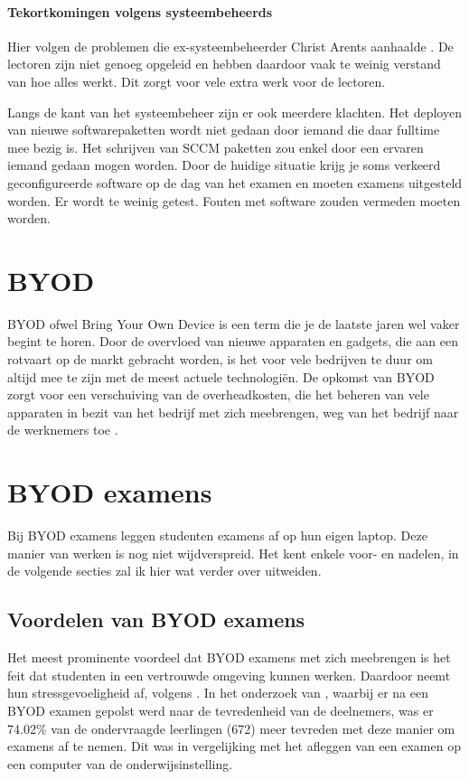 \paragraph{Tekortkomingen volgens systeembeheerds}
Hier volgen de problemen die ex-systeembeheerder Christ Arents aanhaalde \autocite{Arents2019}. De lectoren zijn niet genoeg opgeleid en hebben daardoor vaak te weinig verstand van hoe alles werkt. Dit zorgt voor vele extra werk voor de lectoren. 

Langs de kant van het systeembeheer zijn er ook meerdere klachten. Het deployen van nieuwe softwarepaketten wordt niet gedaan door iemand die daar fulltime mee bezig is. Het schrijven van SCCM paketten zou enkel door een ervaren iemand gedaan mogen worden.  Door de huidige situatie krijg je soms verkeerd geconfigureerde software op de dag van het examen en moeten examens uitgesteld worden. Er wordt te weinig getest. Fouten met software zouden vermeden moeten worden. 

\section{BYOD}

BYOD ofwel Bring Your Own Device is een term die je de laatste jaren wel vaker begint te horen. Door de overvloed van nieuwe apparaten en gadgets, die aan een rotvaart op de markt gebracht worden, is het voor vele bedrijven te duur om altijd mee te zijn met de meest actuele technologiën. De opkomst van BYOD zorgt voor een verschuiving van de overheadkosten, die het beheren van vele apparaten in bezit van het bedrijf met zich meebrengen, weg van het bedrijf naar de werknemers toe \autocite{Hong2016}.

\section{BYOD examens}
Bij BYOD examens leggen studenten examens af op hun eigen laptop. Deze manier van werken is nog niet wijdverspreid. Het kent enkele voor- en nadelen, in de volgende secties zal ik hier wat verder over uitweiden. 

\subsection{Voordelen van BYOD examens}
Het meest prominente voordeel dat BYOD examens met zich meebrengen is het feit dat studenten in een vertrouwde omgeving kunnen werken. Daardoor neemt hun stressgevoeligheid af, volgens
\textcite{TeckSwee2014}. In het onderzoek van \textcite{TeckSwee2014}, waarbij er na een BYOD examen gepolst werd naar de tevredenheid van de deelnemers, was er 74.02\% van de ondervraagde leerlingen (672) meer tevreden met deze manier om examens af te nemen. Dit was in vergelijking met het afleggen van een examen op een computer van de onderwijsinstelling. 

